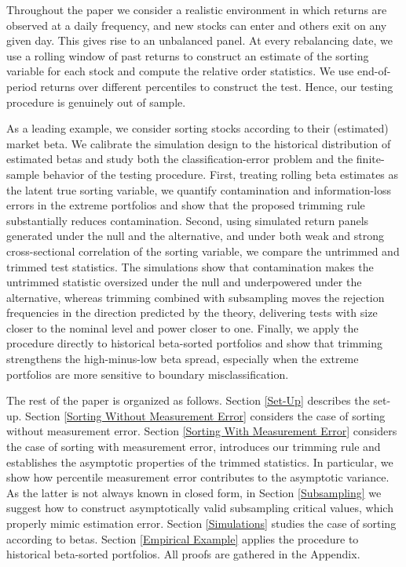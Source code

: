 Throughout the paper we consider a realistic environment in which returns are observed at a daily frequency, and new stocks can enter and others exit on any given day. This gives rise to an unbalanced panel. At every rebalancing date, we use a rolling window of past returns to construct an estimate of the sorting variable for each stock and compute the relative order statistics. We use end-of-period returns over different percentiles to construct the test. Hence, our testing procedure is genuinely out of sample.

As a leading example, we consider sorting stocks according to their (estimated) market beta. We calibrate the simulation design to the historical distribution of estimated betas and study both the classification-error problem and the finite-sample behavior of the testing procedure. First, treating rolling beta estimates as the latent true sorting variable, we quantify contamination and information-loss errors in the extreme portfolios and show that the proposed trimming rule substantially reduces contamination. Second, using simulated return panels generated under the null and the alternative, and under both weak and strong cross-sectional correlation of the sorting variable, we compare the untrimmed and trimmed test statistics. The simulations show that contamination makes the untrimmed statistic oversized under the null and underpowered under the alternative, whereas trimming combined with subsampling moves the rejection frequencies in the direction predicted by the theory, delivering tests with size closer to the nominal level and power closer to one. Finally, we apply the procedure directly to historical beta-sorted portfolios and show that trimming strengthens the high-minus-low beta spread, especially when the extreme portfolios are more sensitive to boundary misclassification.

The rest of the paper is organized as follows. Section \ref{Set-Up} describes the set-up. Section \ref{Sorting Without Measurement Error} considers the case of sorting without measurement error. Section \ref{Sorting With Measurement Error} considers the case of sorting with measurement error, introduces our trimming rule and establishes the asymptotic properties of the trimmed statistics. In particular, we show how percentile measurement error contributes to the asymptotic variance. As the latter is not always known in closed form, in Section \ref{Subsampling} we suggest how to construct asymptotically valid subsampling critical values, which properly mimic estimation error. Section \ref{Simulations} studies the case of sorting according to betas. Section \ref{Empirical Example} applies the procedure to historical beta-sorted portfolios. All proofs are gathered in the Appendix.


